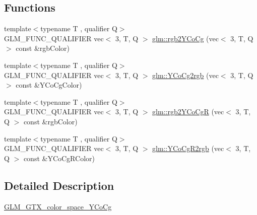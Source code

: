 \subsection*{Functions}
\begin{DoxyCompactItemize}
\item 
{\footnotesize template$<$typename T , qualifier Q$>$ }\\G\+L\+M\+\_\+\+F\+U\+N\+C\+\_\+\+Q\+U\+A\+L\+I\+F\+I\+ER vec$<$ 3, T, Q $>$ \hyperlink{group__gtx__color__space__YCoCg_ga0606353ec2a9b9eaa84f1b02ec391bc5}{glm\+::rgb2\+Y\+Co\+Cg} (vec$<$ 3, T, Q $>$ const \&rgb\+Color)
\item 
{\footnotesize template$<$typename T , qualifier Q$>$ }\\G\+L\+M\+\_\+\+F\+U\+N\+C\+\_\+\+Q\+U\+A\+L\+I\+F\+I\+ER vec$<$ 3, T, Q $>$ \hyperlink{group__gtx__color__space__YCoCg_ga163596b804c7241810b2534a99eb1343}{glm\+::\+Y\+Co\+Cg2rgb} (vec$<$ 3, T, Q $>$ const \&Y\+Co\+Cg\+Color)
\item 
{\footnotesize template$<$typename T , qualifier Q$>$ }\\G\+L\+M\+\_\+\+F\+U\+N\+C\+\_\+\+Q\+U\+A\+L\+I\+F\+I\+ER vec$<$ 3, T, Q $>$ \hyperlink{group__gtx__color__space__YCoCg_ga0389772e44ca0fd2ba4a79bdd8efe898}{glm\+::rgb2\+Y\+Co\+CgR} (vec$<$ 3, T, Q $>$ const \&rgb\+Color)
\item 
{\footnotesize template$<$typename T , qualifier Q$>$ }\\G\+L\+M\+\_\+\+F\+U\+N\+C\+\_\+\+Q\+U\+A\+L\+I\+F\+I\+ER vec$<$ 3, T, Q $>$ \hyperlink{group__gtx__color__space__YCoCg_gaf8d30574c8576838097d8e20c295384a}{glm\+::\+Y\+Co\+Cg\+R2rgb} (vec$<$ 3, T, Q $>$ const \&Y\+Co\+Cg\+R\+Color)
\end{DoxyCompactItemize}


\subsection{Detailed Description}
\hyperlink{group__gtx__color__space__YCoCg}{G\+L\+M\+\_\+\+G\+T\+X\+\_\+color\+\_\+space\+\_\+\+Y\+Co\+Cg} 